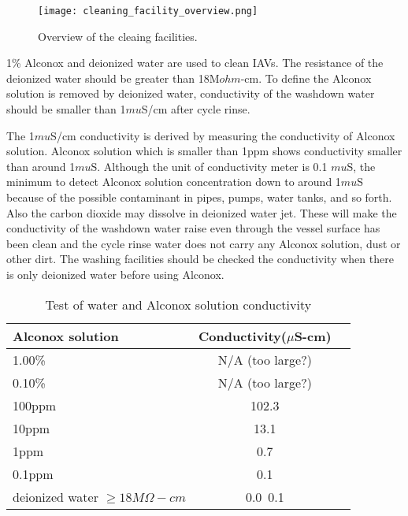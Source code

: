 



\begin{figure}
    \centering
    \texttt{[image: cleaning\_facility\_overview.png]}
    \caption{Overview of the cleaing facilities.}
    \label{cleaning_facility_overview.png}
    \end{figure}

1\% Alconox and deionized water are used to clean IAVs.
The resistance of the deionized water should be greater than 18M$ohm$-cm.
To define the Alconox solution is removed by deionized water, conductivity of the
washdown water should be smaller than 1$mu$S/cm after cycle rinse.



The 1$mu$S/cm conductivity is derived by measuring the conductivity of Alconox solution.
Alconox solution which is smaller than 1ppm shows conductivity smaller than around 1$mu$S.
Although the unit of conductivity meter
is 0.1 $mu$S, the minimum to detect
Alconox solution concentration down to around 1$mu$S because of the possible contaminant
in pipes, pumps, water tanks, and so forth. Also the carbon dioxide may dissolve in
deionized water jet. These will make the conductivity of the washdown water raise
even through the vessel surface has been clean and the cycle rinse water does not
carry any Alconox solution, dust or other dirt. The washing facilities should be checked
the conductivity when there is only deionized water before using Alconox.


\begin{table}
\centering
\caption{Test of water and Alconox solution conductivity}
\label{tab:AlconoxConductivity}
\begin{tabular}{lcp{5.0cm}}
Alconox solution &   Conductivity($\mu$S-cm) \\
\hline
\hline
1.00\% &  N/A (too large?)\\
\hline
0.10\% &  N/A (too large?)\\
\hline
100ppm & 102.3\\
\hline
10ppm  & 13.1\\
\hline
1ppm   & 0.7\\
\hline
0.1ppm & 0.1\\
\hline
deionized water $\geq 18M\Omega-cm$ &0.0~0.1\\
\end{tabular}
\end{table}



